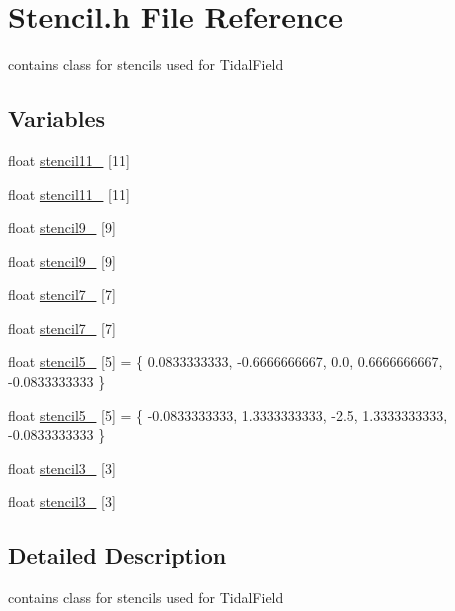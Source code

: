 \section{Stencil.h File Reference}
\label{Stencil_8h}


contains class for stencils used for TidalField  


\subsection*{Variables}
\begin{DoxyCompactItemize}
\item 
float \hyperlink{Stencil_8h_a5ff00e186b05d9309740857597092be3}{stencil11\_} \mbox{[}11\mbox{]}
\item 
float \hyperlink{Stencil_8h_aa8aaf37307346bc1ebc679eae8d5b8f0}{stencil11\_} \mbox{[}11\mbox{]}
\item 
float \hyperlink{Stencil_8h_a2755a49f4437eff2716aaeabc24c8ded}{stencil9\_} \mbox{[}9\mbox{]}
\item 
float \hyperlink{Stencil_8h_a6851d45b9f10e2ea51a79c6e3f7bc640}{stencil9\_} \mbox{[}9\mbox{]}
\item 
float \hyperlink{Stencil_8h_a3d5e3287f4191ae4a5673f453acc7bd1}{stencil7\_} \mbox{[}7\mbox{]}
\item 
float \hyperlink{Stencil_8h_acee80c560824d50b2c2101e5a582ab82}{stencil7\_} \mbox{[}7\mbox{]}
\item 
float \hyperlink{Stencil_8h_a340ae7c6d18197d5b0b39316adf09c92}{stencil5\_} \mbox{[}5\mbox{]} = \{ 0.0833333333, -\/0.6666666667, 0.0, 0.6666666667, -\/0.0833333333 \}
\item 
float \hyperlink{Stencil_8h_a9bda37a23ca01214a651baeebe3eaa64}{stencil5\_} \mbox{[}5\mbox{]} = \{ -\/0.0833333333, 1.3333333333, -\/2.5, 1.3333333333, -\/0.0833333333 \}
\item 
float \hyperlink{Stencil_8h_a4c00704278597cb60e8b47f2dced4887}{stencil3\_} \mbox{[}3\mbox{]}
\item 
float \hyperlink{Stencil_8h_ac0b1e74d97ac3b2b641c229d69a8301b}{stencil3\_} \mbox{[}3\mbox{]}
\end{DoxyCompactItemize}


\subsection{Detailed Description}
contains class for stencils used for TidalField 

